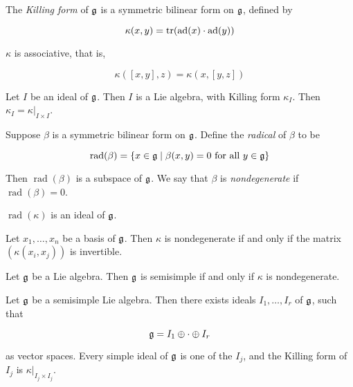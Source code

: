 \documentclass{article}
\DeclareMathOperator{\rad}{rad}
\begin{document}
\begin{definition}
     The \emph{Killing form} of \(\mathfrak{g}\) is a symmetric bilinear form on \(\mathfrak{g}\), defined by

    \[\kappa(x, y) = \tr(\operatorname{ad}(x)\cdot\operatorname{ad}(y))\]
\end{definition}

\begin{proposition}
    \(\kappa\) is associative, that is,

    \[\kappa([x,y],z) = \kappa(x, [y, z])\]
\end{proposition}

\begin{lemma}
    Let \(I\) be an ideal of \(\mathfrak{g}\). Then \(I\) is a Lie algebra, with Killing form \(\kappa_I\). Then \(\kappa_I = \kappa\vert_{I \times I}\).
\end{lemma}

\begin{definition}
     Suppose \(\beta\) is a symmetric bilinear form on \(\mathfrak{g}\). Define the \emph{radical} of \(\beta\) to be

    \[\rad(\beta) = \{x \in \mfg \mid \beta(x, y) = 0 \text{ for all }y \in \mfg\}\]

    Then \(\rad(\beta)\) is a subspace of \(\mathfrak{g}\). We say that \(\beta\) is \emph{nondegenerate} if \(\rad(\beta) = 0\).
\end{definition}

\begin{proposition}
    \(\rad(\kappa)\) is an ideal of \(\mathfrak{g}\).
\end{proposition}

\begin{lemma}
    Let \(x_1, \dots, x_n\) be a basis of \(\mathfrak{g}\). Then \(\kappa\) is nondegenerate if and only if the matrix \((\kappa(x_i, x_j))\) is invertible.
\end{lemma}

\begin{theorem}
    Let \(\mathfrak{g}\) be a Lie algebra. Then \(\mathfrak{g}\) is semisimple if and only if \(\kappa\) is nondegenerate.
\end{theorem}

\begin{theorem}
    Let \(\mathfrak{g}\) be a semisimple Lie algebra. Then there exists ideals \(I_1, \dots, I_r\) of \(\mathfrak{g}\), such that
    
    \[\mathfrak{g} = I_1 \oplus \cdot \oplus I_r\]

    as vector spaces. Every simple ideal of \(\mathfrak{g}\) is one of the \(I_j\), and the Killing form of \(I_j\) is \(\kappa\vert_{I_j \times I_j}\).
\end{theorem}
\end{document}

